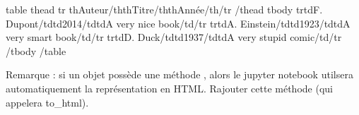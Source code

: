 \documentclass[letterpaper,10pt,english]{sphinxhowto}
\begin{document}
\begin{sphinxVerbatim}[commandchars=\\\{\}]
\PYGZlt{}table\PYGZgt{}
    \PYGZlt{}thead\PYGZgt{}
        \PYGZlt{}tr\PYGZgt{} \PYGZlt{}th\PYGZgt{}Auteur\PYGZlt{}/th\PYGZgt{}\PYGZlt{}th\PYGZgt{}Titre\PYGZlt{}/th\PYGZgt{}\PYGZlt{}th\PYGZgt{}Année\PYGZlt{}/th\PYGZgt{}\PYGZlt{}/tr\PYGZgt{}
    \PYGZlt{}/thead\PYGZgt{}
    \PYGZlt{}tbody\PYGZgt{}
       \PYGZlt{}tr\PYGZgt{}\PYGZlt{}td\PYGZgt{}F. Dupont\PYGZlt{}/td\PYGZgt{}\PYGZlt{}td\PYGZgt{}2014\PYGZlt{}/td\PYGZgt{}\PYGZlt{}td\PYGZgt{}A very nice book\PYGZlt{}/td\PYGZgt{}\PYGZlt{}/tr\PYGZgt{}
       \PYGZlt{}tr\PYGZgt{}\PYGZlt{}td\PYGZgt{}A. Einstein\PYGZlt{}/td\PYGZgt{}\PYGZlt{}td\PYGZgt{}1923\PYGZlt{}/td\PYGZgt{}\PYGZlt{}td\PYGZgt{}A very smart book\PYGZlt{}/td\PYGZgt{}\PYGZlt{}/tr\PYGZgt{}
       \PYGZlt{}tr\PYGZgt{}\PYGZlt{}td\PYGZgt{}D. Duck\PYGZlt{}/td\PYGZgt{}\PYGZlt{}td\PYGZgt{}1937\PYGZlt{}/td\PYGZgt{}\PYGZlt{}td\PYGZgt{}A very stupid comic\PYGZlt{}/td\PYGZgt{}\PYGZlt{}/tr\PYGZgt{}
    \PYGZlt{}/tbody\PYGZgt{}
\PYGZlt{}/table\PYGZgt{}
\end{sphinxVerbatim}

\sphinxAtStartPar
Remarque : si un objet possède une méthode , alors le jupyter notebook utilsera automatiquement la représentation en HTML. Rajouter cette méthode (qui appelera to\_html).
\end{document}
